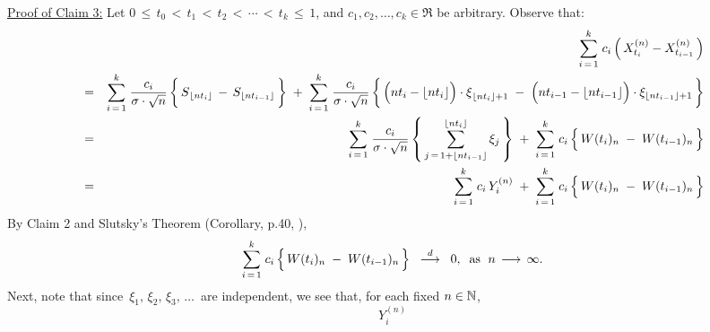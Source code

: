 \begin{enumerate}
		\vskip 0.5cm
		\noindent
		\underline{Proof of Claim 3:}\quad
		Let $0 \,\leq\, t_{0} \,<\, t_{1} \,<\, t_{2} \,<\, \cdots \,<\, t_{k} \,\leq\, 1$,
		and $c_{1}, c_{2}, \ldots, c_{k} \in \Re$ be arbitrary.
		Observe that:
		\begin{eqnarray*}
		&& \overset{k}{\underset{i\,=\,1}{\sum}} \; c_{i}\left(\,X^{(n)}_{t_{i}} - X^{(n)}_{t_{i-1}}\,\right)
		\\
		&=&
		\overset{k}{\underset{i\,=\,1}{\sum}} \; \dfrac{c_{i}}{\sigma\cdot\sqrt{n}}
		\left\{\,
			\overset{{\color{white}1}}{S}_{\lfloor nt_{i} \rfloor} \,-\, S_{\lfloor nt_{i-1} \rfloor}
		\,\right\}
		\;+\;
		\overset{k}{\underset{i\,=\,1}{\sum}} \; \dfrac{c_{i}}{\sigma\cdot\sqrt{n}}
		\left\{\,
			\left(\overset{{\color{white}1}}{n}t_{i} - \lfloor nt_{i} \rfloor\right)\cdot\overset{{\color{white}1}}{\xi}_{\lfloor nt_{i} \rfloor+1}
			\;-\; \left(\overset{{\color{white}1}}{n}t_{i-1} - \lfloor nt_{i-1} \rfloor\right)\cdot\xi_{\lfloor nt_{i-1} \rfloor+1}
		\,\right\}
		\\
		&=&
		\overset{k}{\underset{i\,=\,1}{\sum}} \; \dfrac{c_{i}}{\sigma\cdot\sqrt{n}}
		\left\{\,
			\overset{\lfloor nt_{i} \rfloor}{\underset{j\,=\,1+\lfloor nt_{i-1} \rfloor}{\sum}}\,\xi_{j}
		\,\right\}
		\;+\;
		\overset{k}{\underset{i\,=\,1}{\sum}} \; c_{i} \left\{\,\overset{{\color{white}.}}{W}(t_{i})_{n} \;-\; W(t_{i-1})_{n}\,\right\}
		\\
		&=&
		\overset{k}{\underset{i\,=\,1}{\sum}} \; c_{i}\,Y^{(n)}_{i}
		\;+\;
		\overset{k}{\underset{i\,=\,1}{\sum}} \; c_{i} \left\{\,\overset{{\color{white}.}}{W}(t_{i})_{n} \;-\; W(t_{i-1})_{n}\,\right\}
		\end{eqnarray*}
		By Claim 2 and Slutsky's Theorem (Corollary, p.40, \cite{Ferguson1996}),
		\begin{equation}\label{cBconvergesToZeroInProbability}
		\overset{k}{\underset{i\,=\,1}{\sum}} \; c_{i} \left\{\,\overset{{\color{white}.}}{W}(t_{i})_{n} \;-\; W(t_{i-1})_{n}\,\right\}
		\;\;\overset{d}{\longrightarrow}\;\; 0,
		\;\;\textnormal{as \;$n \,\longrightarrow\, \infty$}.				
		\end{equation}
		Next, note that since \,$\xi_{1},\, \xi_{2},\, \xi_{3},\, \ldots$\, are independent,
		we see that, for each fixed $n \in \mathbb{N}$,
		\begin{equation*}
		Y^{(n)}_{i}

\end{equation*}
\end{enumerate}
